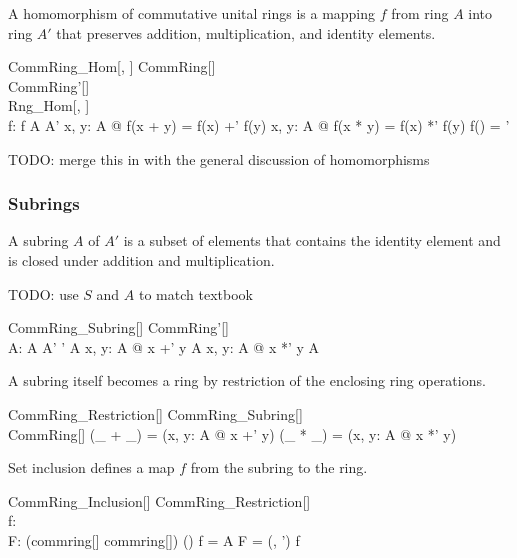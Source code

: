 \documentclass{amsart}
\begin{document}
A homomorphism of commutative unital rings is a mapping $f$ from ring $A$ into ring $A'$ that
preserves addition, multiplication, and identity elements.

\begin{schema}{CommRing\_Hom}[\genT, \genU]
	CommRing[\genT] \\
	CommRing'[\genU] \\
	Rng\_Hom[\genT, \genU] \\
	f: \genT \pfun \genU
\where
	f \in A \fun A'
\also
	\forall x, y: A @ f(x + y) = f(x) +' f(y)
\also
	\forall x, y: A @ f(x * y) = f(x) *' f(y)
\also
	f(\oneRing) = \oneRing'
\end{schema}

TODO: merge this in with the general discussion of homomorphisms

\subsubsection{Subrings}

A subring $A$ of $A'$ is a subset of elements that contains the identity element and is closed under
addition and multiplication.

TODO: use $S$ and $A$ to match textbook

\begin{schema}{CommRing\_Subring}[\genT]
	CommRing'[\genT] \\
	A: \power \genT
\where
	A \subseteq A'
\also
	\oneRing' \in A
\also
	\forall x, y: A @ x +' y \in A
\also
	\forall x, y: A @ x *' y \in A	
\end{schema}

A subring itself becomes a ring by restriction of the enclosing ring operations.

\begin{schema}{CommRing\_Restriction}[\genT]
	CommRing\_Subring[\genT] \\
	CommRing[\genT]
\where
	(\_ + \_) = (\lambda x, y: A @ x +' y)
\also
	(\_ * \_) = (\lambda x, y: A @ x *' y)
\end{schema}

Set inclusion defines a map $f$ from the subring to the ring.

\begin{schema}{CommRing\_Inclusion}[\genT]
	CommRing\_Restriction[\genT] \\
	f: \genT \pfun \genT \\
	F: (commring[\genT] \cross commring[\genT]) \cross (\genT \pfun \genT)
\where
	f = \id A
\also
	F = (\strucA, \strucA') \mapsto f
\end{schema}
\end{document}
